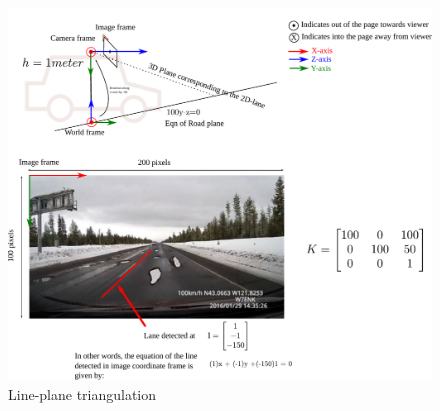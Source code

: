 \documentclass{article}
\begin{document}
\begin{figure}
  \includegraphics[width=\linewidth]{media/image-road-triangulation-line-plane.pdf}
  \caption{Line-plane triangulation}
  \label{fig:line-plane-triangulation}
\end{figure}
\end{document}
